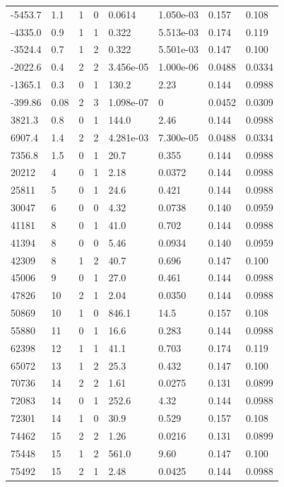 \documentclass[preview]{standalone}
\begin{document}
{{\begin{tabular}{L{1.2cm}C{1.2cm} C{0.3cm}C{0.5cm} C{1.4cm}C{1.4cm} C{1.4cm}C{1.4cm}}
  -5453.7  &   1.1  & 1     &  0 &  0.0614  & 1.050e-03  & 0.157 &  0.108   \\ 
  -4335.0  &   0.9  & 1     &  1 &  0.322  & 5.513e-03  & 0.174 &  0.119   \\ 
  -3524.4  &   0.7  & 1     &  2 &  0.322  & 5.501e-03  & 0.147 &  0.100   \\ 
  -2022.6  &   0.4  & 2     &  2 &  3.456e-05  & 1.000e-06  & 0.0488 &  0.0334   \\ 
  -1365.1  &   0.3  & 0     &  1 &  130.2  & 2.23  & 0.144 &  0.0988   \\ 
  -399.86  &  0.08  & 2     &  3 &  1.098e-07  & 0  & 0.0452 &  0.0309   \\ 
  3821.3  &   0.8  & 0     &  1 &  144.0  & 2.46  & 0.144 &  0.0988   \\ 
  6907.4  &   1.4  & 2     &  2 &  4.281e-03  & 7.300e-05  & 0.0488 &  0.0334   \\ 
  7356.8  &   1.5  & 0     &  1 &  20.7  & 0.355  & 0.144 &  0.0988   \\ 
  20212  &     4  & 0     &  1 &  2.18  & 0.0372  & 0.144 &  0.0988   \\ 
  25811  &     5  & 0     &  1 &  24.6  & 0.421  & 0.144 &  0.0988   \\ 
  30047  &     6  & 0     &  0 &  4.32  & 0.0738  & 0.140 &  0.0959   \\ 
  41181  &     8  & 0     &  1 &  41.0  & 0.702  & 0.144 &  0.0988   \\ 
  41394  &     8  & 0     &  0 &  5.46  & 0.0934  & 0.140 &  0.0959   \\ 
  42309  &     8  & 1     &  2 &  40.7  & 0.696  & 0.147 &  0.100   \\ 
  45006  &     9  & 0     &  1 &  27.0  & 0.461  & 0.144 &  0.0988   \\ 
  47826  &    10  & 2     &  1 &  2.04  & 0.0350  & 0.144 &  0.0988   \\ 
  50869  &    10  & 1     &  0 &  846.1  & 14.5  & 0.157 &  0.108   \\ 
  55880  &    11  & 0     &  1 &  16.6  & 0.283  & 0.144 &  0.0988   \\ 
  62398  &    12  & 1     &  1 &  41.1  & 0.703  & 0.174 &  0.119   \\ 
  65072  &    13  & 1     &  2 &  25.3  & 0.432  & 0.147 &  0.100   \\ 
  70736  &    14  & 2     &  2 &  1.61  & 0.0275  & 0.131 &  0.0899   \\ 
  72083  &    14  & 0     &  1 &  252.6  & 4.32  & 0.144 &  0.0988   \\ 
  72301  &    14  & 1     &  0 &  30.9  & 0.529  & 0.157 &  0.108   \\ 
  74462  &    15  & 2     &  2 &  1.26  & 0.0216  & 0.131 &  0.0899   \\ 
  75448  &    15  & 1     &  2 &  561.0  & 9.60  & 0.147 &  0.100   \\ 
  75492  &    15  & 2     &  1 &  2.48  & 0.0425  & 0.144 &  0.0988   \\ 
\hline 
\end{tabular} 

}}
\end{document}
